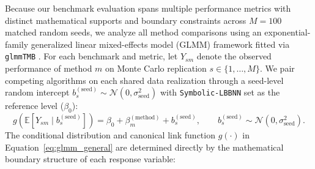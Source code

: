 \documentclass[11pt,a4paper]{article}
\begin{document}
Because our benchmark evaluation spans multiple performance metrics with distinct mathematical supports and boundary constraints across $M = 100$ matched random seeds, we analyze all method comparisons using an exponential-family generalized linear mixed-effects model (GLMM) framework fitted via \texttt{glmmTMB} \citep{brooks2017glmmtmb, hubin2026symbolicrepo}. For each benchmark and metric, let $Y_{sm}$ denote the observed performance of method $m$ on Monte Carlo replication $s \in \{1, \dots, M\}$. We pair competing algorithms on each shared data realization through a seed-level random intercept $b_s^{(\text{seed})} \sim \mathcal{N}(0, \sigma_{\text{seed}}^2)$ with \texttt{Symbolic-LBBNN} set as the reference level ($\beta_0$):
\begin{equation}
\label{eq:glmm_general}
g\!\left(\mathbb{E}[Y_{sm} \mid b_s^{(\text{seed})}]\right) = \beta_0 + \beta_m^{(\text{method})} + b_s^{(\text{seed})}, \qquad b_s^{(\text{seed})} \sim \mathcal{N}(0, \sigma_{\text{seed}}^2).
\end{equation}
The conditional distribution and canonical link function $g(\cdot)$ in Equation~\eqref{eq:glmm_general} are determined directly by the mathematical boundary structure of each response variable:
\end{document}
